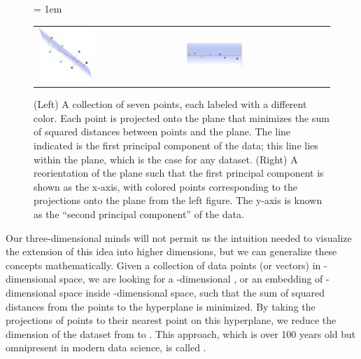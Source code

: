 \begin{figure}[h]
\centering
\mySfFamily
\tabcolsep = 1em
\begin{tabular}{m{} m{}}
\includegraphics[width = 0.4\textwidth]{../images/three_dimensional_pca.png} &
\includegraphics[width = 0.4\textwidth]{../images/three_dimensional_pca_plane.png}
\end{tabular}
\caption{(Left) A collection of seven points, each labeled with a different color. Each point is projected onto the plane that minimizes the sum of squared distances between points and the plane. The line indicated is the first principal component of the data; this line lies within the plane, which is the case for any dataset. (Right) A reorientation of the plane such that the first principal component is shown as the x-axis, with colored points corresponding to the projections onto the plane from the left figure. The y-axis is known as the ``second principal component'' of the data.}
\label{fig:three_dimensional_pca}
\end{figure}

Our three-dimensional minds will not permit us the intuition needed to visualize the extension of this idea into higher dimensions, but we can generalize these concepts mathematically. Given a collection of  data points (or vectors) in -dimensional space, we are looking for a -dimensional , or an embedding of -dimensional space inside -dimensional space, such that the sum of squared distances from the points to the hyperplane is minimized. By taking the projections of points to their nearest point on this hyperplane, we reduce the dimension of the dataset from  to . This approach, which is over 100 years old but omnipresent in modern data science, is called .

